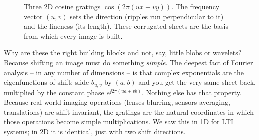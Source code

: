 \begin{figure}[H]
\centering
{}
\caption{Three 2D cosine gratings $\cos(2\pi(ux+vy))$. The frequency vector
$(u,v)$ sets the direction (ripples run perpendicular to it) and the fineness (its
length). These corrugated sheets are the basis from which every image is built.}
\label{ch31:fig-grating}
\end{figure}

\begin{whybox}
Why are these the right building blocks and not, say, little blobs or wavelets?
Because shifting an image must do something \emph{simple}. The deepest fact of
Fourier analysis -- in any number of dimensions -- is that complex exponentials are
the eigenfunctions of shift: slide $b_{u,v}$ by $(a,b)$ and you get the very same
sheet back, multiplied by the constant phase $e^{\jj 2\pi(ua+vb)}$. Nothing else
has that property. Because real-world imaging operations (lenses blurring,
sensors averaging, translations) are shift-invariant, the gratings are the natural
coordinates in which those operations become simple multiplications. We saw this
in 1D for LTI systems; in 2D it is identical, just with two shift directions.
\end{whybox}


